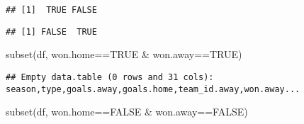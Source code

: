\documentclass[
]{article}
\newenvironment{Shaded}{\begin{snugshade}}{\end{snugshade}}
\newcommand{\ConstantTok}[1]{\textcolor[rgb]{0.00,0.00,0.00}{#1}}
\newcommand{\FunctionTok}[1]{\textcolor[rgb]{0.00,0.00,0.00}{#1}}
\newcommand{\NormalTok}[1]{#1}
\newcommand{\SpecialCharTok}[1]{\textcolor[rgb]{0.00,0.00,0.00}{#1}}
\begin{document}
\begin{verbatim}
## [1]  TRUE FALSE
\end{verbatim}

\begin{Shaded}
\end{Shaded}

\begin{verbatim}
## [1] FALSE  TRUE
\end{verbatim}

\begin{Shaded}
\begin{Highlighting}[]
\FunctionTok{subset}\NormalTok{(df, won.home}\SpecialCharTok{==}\ConstantTok{TRUE} \SpecialCharTok{\&}\NormalTok{ won.away}\SpecialCharTok{==}\ConstantTok{TRUE}\NormalTok{)}
\end{Highlighting}
\end{Shaded}

\begin{verbatim}
## Empty data.table (0 rows and 31 cols): season,type,goals.away,goals.home,team_id.away,won.away...
\end{verbatim}

\begin{Shaded}
\begin{Highlighting}[]
\FunctionTok{subset}\NormalTok{(df, won.home}\SpecialCharTok{==}\ConstantTok{FALSE} \SpecialCharTok{\&}\NormalTok{ won.away}\SpecialCharTok{==}\ConstantTok{FALSE}\NormalTok{)}
\end{Highlighting}
\end{Shaded}
\end{document}
